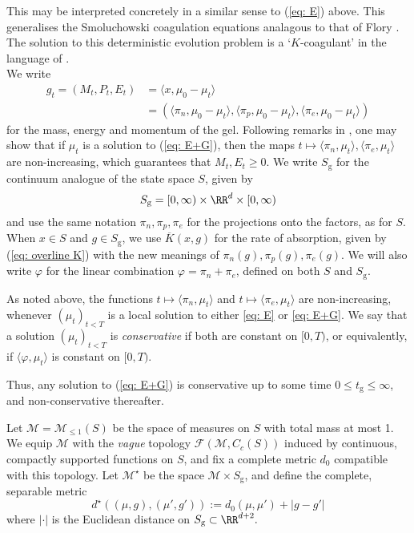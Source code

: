 This may be interpreted concretely in a similar sense to  (\ref{eq: E}) above.
This generalises the Smoluchowski coagulation equations \cite{vS16} analagous to that of Flory \cite{ZS80}.
The solution to this deterministic evolution problem is a `$K$-coagulant' in the language of \cite{N00}. \medskip \\ We write \begin{equation}\label{eq: gel data} \begin{split}
   g_t= (M_t, P_t, E_t)&=\langle x, \mu_0-\mu_t\rangle \\ &= \left(\langle \pi_n, \mu_0-\mu_t\rangle,\langle \pi_p, \mu_0-\mu_t\rangle,\langle \pi_e, \mu_0-\mu_t\rangle\right) \end{split}
\end{equation} for the mass, energy and momentum of the gel. Following remarks in \cite{N00}, one may show that if $\mu_t$ is a solution to (\ref{eq: E+G}), then the maps $t\mapsto \langle \pi_n, \mu_t\rangle, \langle \pi_e, \mu_t\rangle$ are non-increasing, which guarantees that $M_t, E_t\ge 0$. We write  $S_\mathrm{g}$ for the continuum analogue of the state space $S$, given by \begin{equation}
    S_\mathrm{g}=[0,\infty)\times \RR^d\times [0,\infty)
\end{equation} and use the same notation $\pi_n, \pi_p, \pi_e$ for the projections onto the factors, as for $S$. When $x\in S$ and $g\in S_\mathrm{g}$, we use $\overline{K}(x,g)$ for the rate of absorption, given by (\ref{eq: overline K}) with the new meanings of $\pi_n(g), \pi_p(g),\pi_e(g).$ We will also write $\varphi$ for the linear combination $\varphi=\pi_n+\pi_e$, defined on both $S$ and $ S_\mathrm{g}$.

\begin{definition} As noted above, the functions $t\mapsto \langle \pi_n, \mu_t\rangle$ and $t\mapsto \langle \pi_e, \mu_t\rangle$ are non-increasing, whenever $(\mu_t)_{t<T}$ is a local solution to either \eqref{eq: E} or \eqref{eq: E+G}. We say that a solution $(\mu_t)_{t<T}$ is \emph{conservative} if both are constant on $[0,T)$, or equivalently, if $\langle \varphi, \mu_t\rangle$ is constant on $[0,T)$. \end{definition}
 Thus, any solution to (\ref{eq: E+G}) is conservative up to some time $0\le t_\mathrm{g}\leq \infty$, and non-conservative thereafter.
 
\begin{definition} Let $\mathcal{M}=\mathcal{M}_{\le 1}(S)$ be the space of measures on $S$ with total mass at most 1. We equip $\mathcal{M}$ with the \emph{vague} topology $\mathcal{F}(\mathcal{M}, C_c(S))$ induced by continuous, compactly supported functions on $S$, and fix a complete metric $d_0$ compatible with this topology. Let $\mathcal{M}^\star$ be the space $\mathcal{M}\times S_\mathrm{g}$, and define the complete, separable metric \begin{equation} d^\star\left((\mu, g), (\mu', g')\right):=d_0(\mu, \mu')+|g-g'| \end{equation} where $|\cdot|$ is the Euclidean distance on $S_\mathrm{g}\subset \RR^{d+2}.$ \end{definition}

